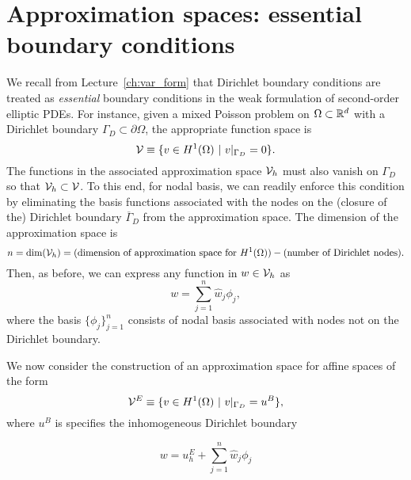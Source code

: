 \section{Approximation spaces: essential boundary conditions}
We recall from Lecture~\ref{ch:var_form} that Dirichlet boundary conditions are treated as \emph{essential} boundary conditions in the weak formulation of second-order elliptic PDEs.  For instance, given a mixed Poisson problem on $\Omega \subset \mathbb{R}^d$ with a Dirichlet boundary $\Gamma_D \subset \partial \Omega$, the appropriate function space is
\begin{equation*}
  \mathcal{V} \equiv \{ v \in H^1(\Omega) \ | \ v|_{\Gamma_D} = 0 \}.
\end{equation*}
The functions in the associated approximation space $\mathcal{V}_h$ must also vanish on $\Gamma_D$ so that $\mathcal{V}_h \subset \mathcal{V}$.  To this end, for nodal basis, we can readily enforce this condition by eliminating the basis functions associated with the nodes on the (closure of the) Dirichlet boundary $\overline \Gamma_D$ from the approximation space. The dimension of the approximation space is
\begin{equation*}
  n = \text{dim}(\mathcal{V}_h) = (\text{dimension of approximation space for $H^1(\Omega)$}) - (\text{number of Dirichlet nodes}).
\end{equation*}
Then, as before, we can express any function in $w \in \mathcal{V}_h$ as
\begin{equation*}
  w = \sum_{j=1}^n \hat w_j \phi_j,
\end{equation*}
where the basis $\{ \phi_j \}_{j=1}^n$ consists of nodal basis associated with nodes not on the Dirichlet boundary.

We now consider the construction of an approximation space for affine spaces of the form
\begin{equation*}
  \mathcal{V}^E \equiv \{ v \in H^1(\Omega) \ | \ v|_{\Gamma_D} = u^B \},
\end{equation*}
where $u^B$ is specifies the inhomogeneous Dirichlet boundary 

\begin{equation*}
  w = u^E_h + \sum_{j=1}^n \hat w_j \phi_j
\end{equation*}
  


